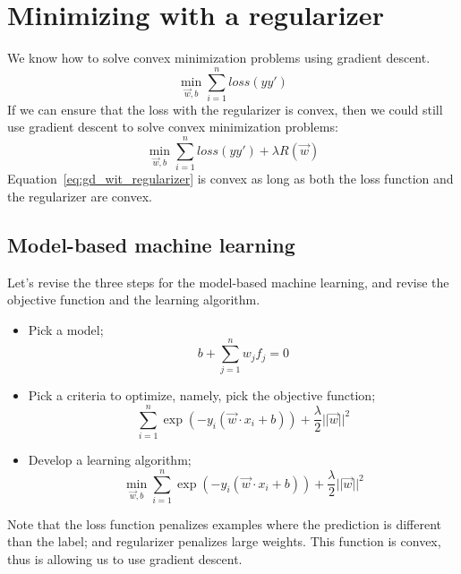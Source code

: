 \section{Minimizing with a regularizer}
We know how to solve convex minimization problems using gradient descent.
\begin{equation*}
    \min_{\vec{w},b} \sum_{i=1}^n loss(yy')
\end{equation*}
If we can ensure that the loss with the regularizer is convex, then we could still use gradient descent to solve convex minimization problems:
\begin{equation}
    \label{eq:gd_wit_regularizer}
    \min_{\vec{w},b} \sum_{i=1}^n loss(yy') + \lambda R(\vec{w})
\end{equation}
Equation~\ref{eq:gd_wit_regularizer} is convex as long as both the loss function and the regularizer are convex.

\subsection{Model-based machine learning}
Let's revise the three steps for the model-based machine learning, and revise the objective function and the learning algorithm.
\begin{itemize}
    \item Pick a model;
    \begin{equation}
        b + \sum_{j=1}^n w_jf_j = 0
    \end{equation}
    \item Pick a criteria to optimize, namely, pick the objective function;
    \begin{equation}
        \sum_{i=1}^n \exp(-y_i(\vec{w} \cdot x_i + b)) + \frac \lambda 2 ||\vec{w}||^2
    \end{equation}
    \item Develop a learning algorithm;
    \begin{equation}
        \min_{\vec{w},b} \sum_{i=1}^n \exp(-y_i(\vec{w} \cdot x_i + b)) + \frac \lambda 2 ||\vec{w}||^2
    \end{equation}
\end{itemize}
Note that the loss function penalizes examples where the prediction is different than the label; and regularizer penalizes large weights. This function is convex, thus is allowing us to use gradient descent.

